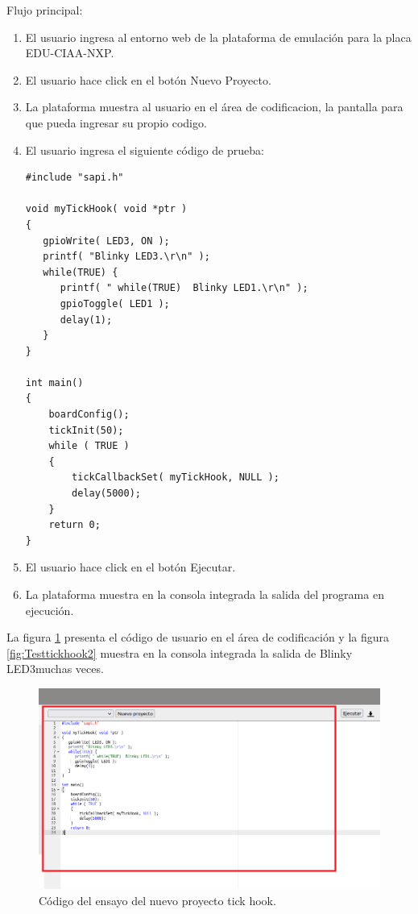 Flujo principal:
\begin{enumerate}
	\item El usuario ingresa al entorno web de la plataforma de emulación para la placa EDU-CIAA-NXP.
	\item El usuario hace click en el botón \textquotedbl Nuevo Proyecto\textquotedbl.
	\item La plataforma muestra al usuario en el área de codificacion, la pantalla para que pueda ingresar su propio codigo.
	\item El usuario ingresa el siguiente código de prueba:
	
\begin{lstlisting}[caption={nuevo proyecto}]
#include "sapi.h"

void myTickHook( void *ptr )
{
   gpioWrite( LED3, ON );
   printf( "Blinky LED3.\r\n" );
   while(TRUE) {
      printf( " while(TRUE)  Blinky LED1.\r\n" );
      gpioToggle( LED1 );
      delay(1);
   }
}

int main()
{
    boardConfig();
    tickInit(50);
    while ( TRUE )
    {
		tickCallbackSet( myTickHook, NULL );
		delay(5000);
    }
    return 0;
}
\end{lstlisting}

	\item El usuario hace click en el botón \textquotedbl Ejecutar\textquotedbl.
	\item La plataforma muestra en la consola integrada la salida del programa en ejecución.
	
\end{enumerate}
	

La figura \ref{fig:Testtickhook1} presenta el código de usuario en el área de codificación y la figura \ref{fig:Testtickhook2} muestra en la consola integrada la salida de \textquotedbl Blinky LED3\textquotedbl muchas veces. 


\begin{figure}[ht]
	\centering
	\includegraphics[scale=.41]{./Figures/Testtickhook1.png}
	\caption{Código del ensayo del nuevo proyecto tick hook.}
	\label{fig:Testtickhook1}
\end{figure}

